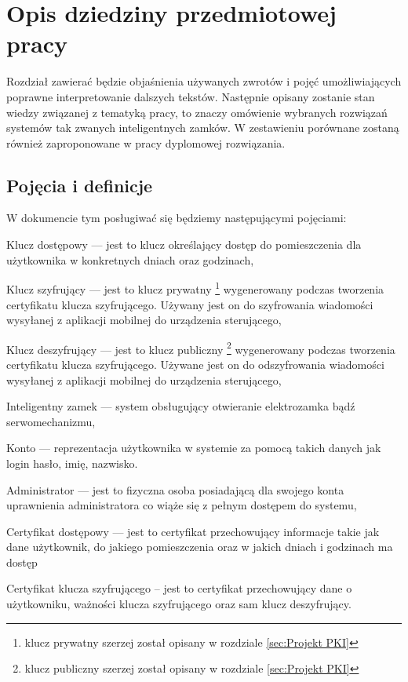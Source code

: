 % 
\newpage
\section{Opis dziedziny przedmiotowej pracy}\label{sec:dziedzina}
Rozdział zawierać będzie objaśnienia używanych zwrotów i pojęć umożliwiających poprawne interpretowanie dalszych tekstów. Następnie opisany zostanie stan wiedzy związanej z tematyką pracy, to znaczy omówienie wybranych rozwiązań systemów tak zwanych inteligentnych zamków. W zestawieniu porównane zostaną również zaproponowane w pracy dyplomowej rozwiązania.
\subsection{Pojęcia i definicje}\label{sec:Pojęcia i definicje}
W dokumencie tym posługiwać się będziemy następującymi pojęciami:
\begin{itemize*}
	\item {Klucz dostępowy} --- jest to  klucz określający dostęp do pomieszczenia dla użytkownika w konkretnych dniach oraz godzinach,
	\item {Klucz szyfrujący} 
	--- jest to klucz prywatny \footnote{ klucz prywatny szerzej został opisany w rozdziale \ref{sec:Projekt PKI}} wygenerowany podczas tworzenia certyfikatu klucza szyfrującego. Używany jest on do szyfrowania wiadomości wysyłanej z aplikacji mobilnej do urządzenia sterującego,
	\item {Klucz deszyfrujący }
	--- jest to klucz publiczny \footnote{ klucz publiczny szerzej został opisany w rozdziale \ref{sec:Projekt PKI}} wygenerowany podczas tworzenia certyfikatu klucza szyfrującego. Używane jest on do odszyfrowania wiadomości wysyłanej z aplikacji mobilnej do urządzenia sterującego,
	\item {Inteligentny zamek}
	--- system obsługujący otwieranie elektrozamka bądź serwomechanizmu,
	\item {Konto}
	--- reprezentacja użytkownika w systemie za pomocą takich danych jak login hasło, imię, nazwisko.
	\item {Administrator}
	--- jest to fizyczna osoba posiadającą dla swojego konta uprawnienia administratora co wiąże się z pełnym dostępem do systemu,
	\item {Certyfikat dostępowy}
	--- jest to certyfikat przechowujący informacje takie jak dane użytkownik, do jakiego pomieszczenia oraz w jakich dniach i godzinach	ma dostęp
	\item {Certyfikat klucza szyfrującego}
	-- jest to certyfikat przechowujący dane o użytkowniku, ważności klucza szyfrującego oraz sam klucz deszyfrujący.
\end{itemize*}

